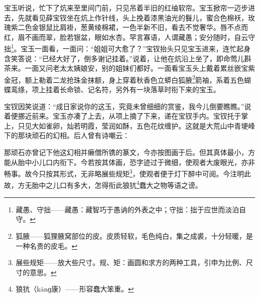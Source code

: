 \par 宝玉听说，忙下了炕来至里间门前，只见吊着半旧的红䌷软帘。宝玉掀帘一迈步进去，先就看见薛宝钗坐在炕上作针线，头上挽着漆黑油光的䰖儿，蜜合色棉袄，玫瑰紫二色金银鼠比肩褂，葱黄绫棉裙，一色半新不旧，看去不觉奢华。唇不点而红，眉不画而翠，脸若银盆，眼如水杏。罕言寡语，人谓藏愚；安分随时，自云守拙\footnote{藏愚、守拙——藏愚：藏智巧于愚讷的外表之中；守拙：拙于应世而淡泊自守。}。宝玉一面看，一面问：“姐姐可大愈了？”宝钗抬头只见宝玉进来，连忙起身含笑答说：“已经大好了，倒多谢记挂着。”说着，让他在炕沿上坐了，即命莺儿斟茶来。一面又问老太太姨娘安，别的姐妹们都好。一面看宝玉头上戴着累丝嵌宝紫金冠，额上勒着二龙抢珠金抹额，身上穿着秋香色立蟒白狐腋\footnote{狐腋——狐狸腋窝部位的皮。皮质轻软，毛色纯白，集之成裘，十分轻暖，是一种名贵的皮毛。}箭袖，系着五色蝴蝶鸾绦，项上挂着长命锁、记名符，另外有一块落草时衔下来的宝玉。
\par 宝钗因笑说道：“成日家说你的这玉，究竟未曾细细的赏鉴，我今儿倒要瞧瞧。”说着便挪近前来。宝玉亦凑了上去，从项上摘了下来，递在宝钗手内。宝钗托于掌上，只见大如雀卵，灿若明霞，莹润如酥，五色花纹缠护。这就是大荒山中青埂峰下的那块顽石的幻相。后人曾有诗嘲云：
\par 那顽石亦曾记下他这幻相并癞僧所镌的篆文，今亦按图画于后。但其真体最小，方能从胎中小儿口内衔下。今若按其体画，恐字迹过于微细，使观者大废眼光，亦非畅事。故今只按其形式，无非略展些规矩\footnote{展些规矩——放大些尺寸。规、矩：画圆和求方的两种工具，引申为比例、尺寸的意思。}，使观者便于灯下醉中可阅。今注明此故，方无胎中之儿口有多大，怎得衔此狼犺\footnote{狼犺（kānɡ康）——形容蠢大笨重。}蠢大之物等语之谤。
